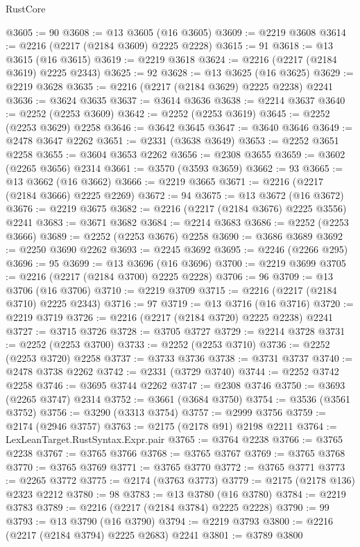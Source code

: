 \begin{lexlean}{RustCore}
\begin{coremodule}
@3605 := 90
@3608 := @13 @3605 (@16 @3605)
@3609 := @2219 @3608
@3614 := @2216 (@2217 (@2184 @3609) @2225 @2228)
@3615 := 91
@3618 := @13 @3615 (@16 @3615)
@3619 := @2219 @3618
@3624 := @2216 (@2217 (@2184 @3619) @2225 @2343)
@3625 := 92
@3628 := @13 @3625 (@16 @3625)
@3629 := @2219 @3628
@3635 := @2216 (@2217 (@2184 @3629) @2225 @2238) @2241
@3636 := @3624 @3635
@3637 := @3614 @3636
@3638 := @2214 @3637
@3640 := @2252 (@2253 @3609)
@3642 := @2252 (@2253 @3619)
@3645 := @2252 (@2253 @3629) @2258
@3646 := @3642 @3645
@3647 := @3640 @3646
@3649 := @2478 @3647 @2262
@3651 := @2331 (@3638 @3649)
@3653 := @2252 @3651 @2258
@3655 := @3604 @3653 @2262
@3656 := @2308 @3655
@3659 := @3602 (@2265 @3656) @2314
@3661 := @3570 (@3593 @3659)
@3662 := 93
@3665 := @13 @3662 (@16 @3662)
@3666 := @2219 @3665
@3671 := @2216 (@2217 (@2184 @3666) @2225 @2269)
@3672 := 94
@3675 := @13 @3672 (@16 @3672)
@3676 := @2219 @3675
@3682 := @2216 (@2217 (@2184 @3676) @2225 @3556) @2241
@3683 := @3671 @3682
@3684 := @2214 @3683
@3686 := @2252 (@2253 @3666)
@3689 := @2252 (@2253 @3676) @2258
@3690 := @3686 @3689
@3692 := @2250 @3690 @2262
@3693 := @2245 @3692
@3695 := @2246 (@2266 @295)
@3696 := 95
@3699 := @13 @3696 (@16 @3696)
@3700 := @2219 @3699
@3705 := @2216 (@2217 (@2184 @3700) @2225 @2228)
@3706 := 96
@3709 := @13 @3706 (@16 @3706)
@3710 := @2219 @3709
@3715 := @2216 (@2217 (@2184 @3710) @2225 @2343)
@3716 := 97
@3719 := @13 @3716 (@16 @3716)
@3720 := @2219 @3719
@3726 := @2216 (@2217 (@2184 @3720) @2225 @2238) @2241
@3727 := @3715 @3726
@3728 := @3705 @3727
@3729 := @2214 @3728
@3731 := @2252 (@2253 @3700)
@3733 := @2252 (@2253 @3710)
@3736 := @2252 (@2253 @3720) @2258
@3737 := @3733 @3736
@3738 := @3731 @3737
@3740 := @2478 @3738 @2262
@3742 := @2331 (@3729 @3740)
@3744 := @2252 @3742 @2258
@3746 := @3695 @3744 @2262
@3747 := @2308 @3746
@3750 := @3693 (@2265 @3747) @2314
@3752 := @3661 (@3684 @3750)
@3754 := @3536 (@3561 @3752)
@3756 := @3290 (@3313 @3754)
@3757 := @2999 @3756
@3759 := @2174 (@2946 @3757)
@3763 := @2175 (@2178 @91) @2198 @2211
@3764 := LexLeanTarget.RustSyntax.Expr.pair
@3765 := @3764 @2238
@3766 := @3765 @2238
@3767 := @3765 @3766
@3768 := @3765 @3767
@3769 := @3765 @3768
@3770 := @3765 @3769
@3771 := @3765 @3770
@3772 := @3765 @3771
@3773 := @2265 @3772
@3775 := @2174 (@3763 @3773)
@3779 := @2175 (@2178 @136) @2323 @2212
@3780 := 98
@3783 := @13 @3780 (@16 @3780)
@3784 := @2219 @3783
@3789 := @2216 (@2217 (@2184 @3784) @2225 @2228)
@3790 := 99
@3793 := @13 @3790 (@16 @3790)
@3794 := @2219 @3793
@3800 := @2216 (@2217 (@2184 @3794) @2225 @2683) @2241
@3801 := @3789 @3800

\end{coremodule}
\end{lexlean}
